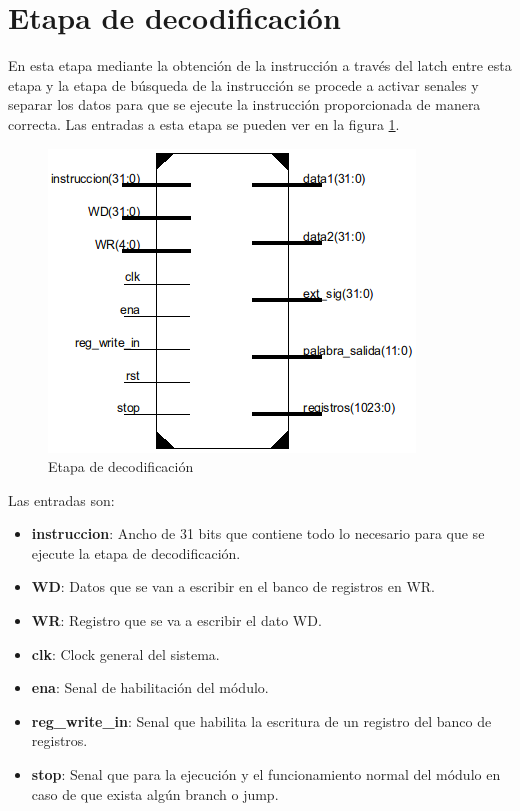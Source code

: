 \section{Etapa de decodificaci\'on}

En esta etapa mediante la obtenci\'on de la instrucci\'on a trav\'es del latch entre esta etapa y la etapa de b\'usqueda de la instrucci\'on se procede a activar senales y separar los datos para que se ejecute la instrucci\'on proporcionada de manera correcta.
Las entradas a esta etapa se pueden ver en la figura \ref{fig:decode}.

\begin{figure}[H]
\centering
\includegraphics[scale=0.5]{img/decode_stage}
\caption{Etapa de decodificaci\'on}
\label{fig:decode}
\end{figure}

 
Las entradas son: 
\begin{itemize}
  \item \textbf{instruccion}: Ancho de 31 bits que contiene todo lo necesario para que se ejecute la etapa de decodificaci\'on.
  \item \textbf{WD}: Datos que se van a escribir en el banco de registros en WR.
  \item \textbf{WR}: Registro que se va a escribir el dato WD.
  \item \textbf{clk}: Clock general del sistema.
  \item \textbf{ena}: Senal de habilitaci\'on del m\'odulo.
  \item \textbf{reg\_write\_in}: Senal que habilita la escritura de un registro del banco de registros.
  \item \textbf{stop}: Senal que para la ejecuci\'on y el funcionamiento normal del m\'odulo en caso de que exista alg\'un branch o jump. 
\end{itemize}

